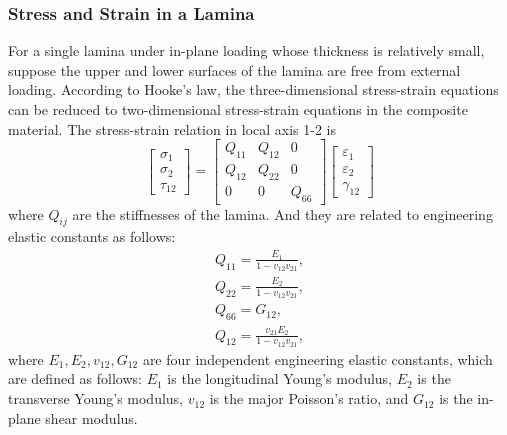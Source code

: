 \subsubsection{Stress and Strain in a Lamina}
For a single lamina under in-plane loading whose thickness is relatively small,
suppose the upper and lower surfaces of the lamina are free from external
loading. According to Hooke's law, the three-dimensional stress-strain
equations can be reduced to two-dimensional stress-strain equations in the
composite material. The stress-strain relation in local axis 1-2 is
\begin{equation}
	\left[
		\begin{array}{l}
        	\sigma _1\\
        	\sigma _2\\
        	\tau_{12}
    	\end{array}
	\right]
    =
	\left[
		\begin{array}{ccc}
        	Q_{11} & Q_{12} & 0\\
        	Q_{12} & Q_{22} & 0\\
        	0      & 0     & Q_{66}
    	\end{array}
	\right]
	\left[
		\begin{array}{l}
        	\varepsilon_1\\
        	\varepsilon_2\\
			\gamma_{12}
		\end{array} 
	\right]
\end{equation}
where $Q_{ij} $ are the stiffnesses of the lamina. And they are related to
engineering elastic constants as follows:
\begin{equation}
	\begin{array}{l}
		Q_{11}=\frac{E_1}{1-v_{12}v_{21}} \textstyle{,} \\
    	Q_{22}=\frac{E_2}{1-v_{12}v_{21}} \textstyle{,}\\
    	Q_{66}=G_{12} \textstyle{,}\\
    	Q_{12}=\frac{v_{21}E_2}{1-v_{12}v_{21}} \textstyle{,}
    \end{array}
\end{equation}
where $E_1, E_2, v_{12}, G_{12} $ are four independent engineering elastic
constants, which are defined as follows: $E_1 $ is the longitudinal Young's
modulus, $E_2 $ is the transverse Young's modulus, $v_{12} $ is the major
Poisson's ratio, and $G_{12} $ is the in-plane shear modulus.

